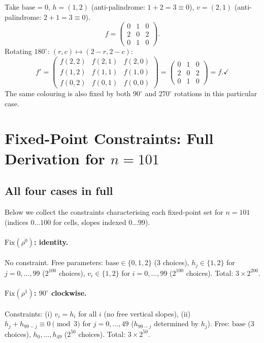 \documentclass{article}
\newcommand{\Fix}{\mathrm{Fix}}
\begin{document}
Take $\mathrm{base}=0$, $h=(1,2)$ (anti-palindrome:
$1+2=3\equiv 0$), $v=(2,1)$ (anti-palindrome: $2+1=3\equiv 0$).
\[
  f = \begin{pmatrix}0&1&0\\2&0&2\\0&1&0\end{pmatrix}.
\]
Rotating $180^\circ$: $(r,c)\mapsto(2-r,2-c)$:
\[
  f' =\begin{pmatrix}
    f(2,2)&f(2,1)&f(2,0)\\
    f(1,2)&f(1,1)&f(1,0)\\
    f(0,2)&f(0,1)&f(0,0)
  \end{pmatrix}
  = \begin{pmatrix}0&1&0\\2&0&2\\0&1&0\end{pmatrix}
  = f. \checkmark
\]
The same colouring is also fixed by both $90^\circ$ and
$270^\circ$ rotations in this particular case.

\section{Fixed-Point Constraints: Full Derivation for $n=101$}
\label{app:derivation}

\subsection{All four cases in full}

Below we collect the constraints characterising each
fixed-point set for $n=101$ (indices $0\ldots 100$ for cells,
slopes indexed $0\ldots 99$).

\paragraph{$\Fix(\rho^0)$: identity.}
No constraint.  Free parameters:
$\mathrm{base}\in\{0,1,2\}$ (3 choices),
$h_j\in\{1,2\}$ for $j=0,\ldots,99$ ($2^{100}$ choices),
$v_i\in\{1,2\}$ for $i=0,\ldots,99$ ($2^{100}$ choices).
Total: $3\times 2^{200}$.

\paragraph{$\Fix(\rho^1)$: $90^\circ$ clockwise.}
Constraints:
(i) $v_i = h_i$ for all $i$ (no free vertical slopes),
(ii) $h_j + h_{99-j} \equiv 0\pmod3$ for $j=0,\ldots,49$
  ($h_{99-j}$ determined by $h_j$).
Free: $\mathrm{base}$ (3 choices), $h_0,\ldots,h_{49}$
  ($2^{50}$ choices).
Total: $3\times 2^{50}$.
\end{document}
